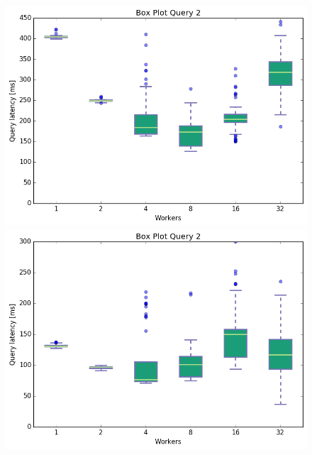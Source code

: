 \documentclass[11pt,singlecolumn]{scrartcl}
\begin{document}
\begin{figure}[!tbp]
  \centering
  \RawFloats
  \begin{minipage}[b]{0.5\textwidth}
    \includegraphics[width=\textwidth]{boxesjl/q2}
  \end{minipage}
  \hfill
  \begin{minipage}[b]{0.5\textwidth}
    \includegraphics[width=\textwidth]{boxesjs/q2}
  \end{minipage}
\end{figure}
\clearpage
\end{document}
